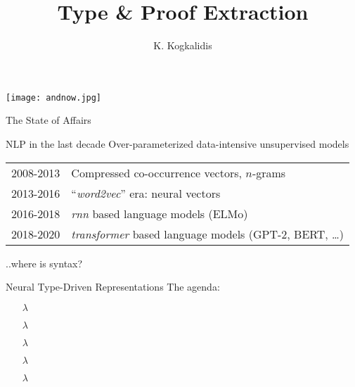 \documentclass{beamer}
\title{Type \& Proof Extraction}
\author{K. Kogkalidis}
\institute{Logic \& Language 2020}
\begin{document}
\begin{frame}
\centering
\texttt{[image: andnow.jpg]}
\end{frame}

\begin{frame}{The State of Affairs}
\small
\begin{block}{NLP in the last decade}
	Over-parameterized data-intensive unsupervised models\\
	\begin{tabularx}{0.5\textwidth}{ll}
	2008-2013 & Compressed co-occurrence vectors, $n$-grams\\
	2013-2016 & ``\textit{word2vec}'' era: neural vectors\\
	2016-2018 & \textit{rnn} based language models (ELMo)\\
	2018-2020 & \textit{transformer} based language models (GPT-2, BERT, \dots)
	\end{tabularx}
\end{block}
\vfill

\pause
\begin{flushright}
	..where is syntax?
\end{flushright}

\end{frame}

\begin{frame}{Neural Type-Driven Representations}
\small
The agenda:
\begin{itemize}
	\item[$\lambda$] 
	\item[$\lambda$] 
	\item[$\lambda$] 
	\item[$\lambda$] 
	\item[$\lambda$] 
\end{itemize}
\end{frame}
\end{document}
